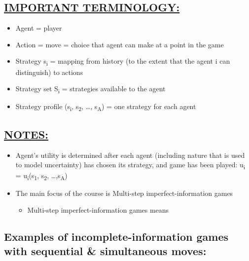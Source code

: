 \documentclass[
]{article}
\begin{document}
\subsection*{\texorpdfstring{\textbf{\ul{IMPORTANT
TERMINOLOGY:}}}{IMPORTANT TERMINOLOGY:}}\label{important-terminology}

\begin{itemize}
\item
  Agent = player
\item
  Action = move = choice that agent can make at a point in the game
\item
  Strategy s\textsubscript{i} = mapping from history (to the extent that
  the agent i can distinguish) to actions
\item
  Strategy set S\textsubscript{i} = strategies available to the agent
\item
  Strategy profile (s\textsubscript{i}, s\textsubscript{2}, \ldots,
  s\textsubscript{\textbar A\textbar{}}) = one strategy for each agent
\end{itemize}

\subsection*{\texorpdfstring{\textbf{\ul{NOTES:}}}{NOTES:}}\label{notes}

\begin{itemize}
\item
  Agent's utility is determined after each agent (including nature that
  is used to model uncertainty) has chosen its strategy, and game has
  been played: u\textsubscript{i} =
  u\textsubscript{i}(s\textsubscript{1}, s\textsubscript{2},
  \ldots,s\textsubscript{\textbar A\textbar{}})
\item
  The main focus of the course is Multi-step imperfect-information games

  \begin{itemize}
  \item
    Multi-step imperfect-information games means
  \end{itemize}
\end{itemize}

\subsection{Examples of incomplete-information games with sequential \&
simultaneous
moves:}\label{examples-of-incomplete-information-games-with-sequential-simultaneous-moves}
\end{document}
